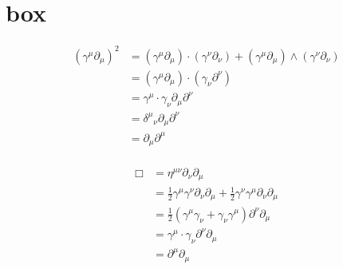 
%
%




\chapter{box}
\date{ Mmm dd, 2008.  Last Revision: $Date: 2009/06/04 12:52:02 $ }

%

%


\begin{align*}
(\gamma^\mu \partial_\mu)^2 
&= 
(\gamma^\mu \partial_\mu) \cdot (\gamma^\nu \partial_\nu)
+ (\gamma^\mu \partial_\mu) \wedge (\gamma^\nu \partial_\nu) \\
&= (\gamma^\mu \partial_\mu) \cdot (\gamma_\nu \partial^\nu) \\
&= \gamma^\mu \cdot \gamma_\nu \partial_\mu \partial^\nu \\
&= {\delta^\mu}_\nu \partial_\mu \partial^\nu \\
&= \partial_\mu \partial^\mu \\
\end{align*}


\begin{align*}
\Box
&= \eta ^{\mu\nu}\partial_{\nu}  \partial_{\mu}  \\
&= \frac{1}{2}\gamma^{\mu}\gamma^{\nu} \partial_{\nu}  \partial_{\mu} +\frac{1}{2}\gamma^{\nu}\gamma^{\mu} \partial_{\nu}  \partial_{\mu} \\
&= \frac{1}{2}\left(\gamma^{\mu}\gamma_{\nu} + \gamma_{\nu}\gamma^{\mu} \right) \partial^{\nu} \partial_{\mu} \\
&= \gamma^\mu \cdot \gamma_\nu \partial^{\nu} \partial_{\mu} \\
&= \partial^{\mu} \partial_{\mu} \\
\end{align*}


